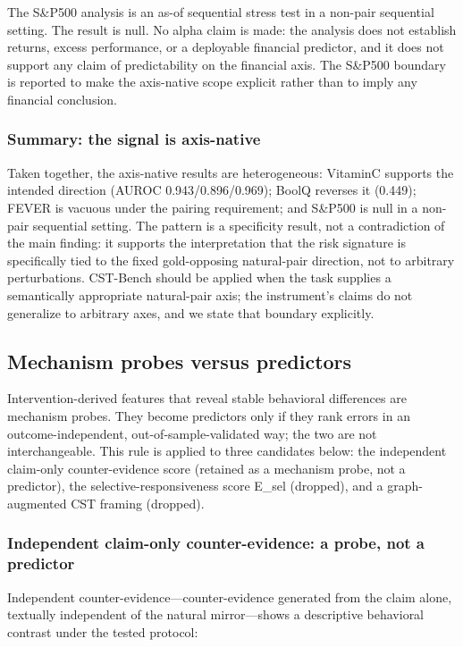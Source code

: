 \documentclass[11pt]{article}
\begin{document}
The S\&P500 analysis is an as-of sequential stress test in a non-pair sequential setting. The result is null. No alpha claim is made: the analysis does not establish returns, excess performance, or a deployable financial predictor, and it does not support any claim of predictability on the financial axis. The S\&P500 boundary is reported to make the axis-native scope explicit rather than to imply any financial conclusion.

\subsubsection{Summary: the signal is axis-native}

Taken together, the axis-native results are heterogeneous: VitaminC supports the intended direction (AUROC 0.943/0.896/0.969); BoolQ reverses it (0.449); FEVER is vacuous under the pairing requirement; and S\&P500 is null in a non-pair sequential setting. The pattern is a specificity result, not a contradiction of the main finding: it supports the interpretation that the risk signature is specifically tied to the fixed gold-opposing natural-pair direction, not to arbitrary perturbations. CST-Bench should be applied when the task supplies a semantically appropriate natural-pair axis; the instrument's claims do not generalize to arbitrary axes, and we state that boundary explicitly.

\subsection{Mechanism probes versus predictors}

Intervention-derived features that reveal stable behavioral differences are mechanism probes. They become predictors only if they rank errors in an outcome-independent, out-of-sample-validated way; the two are not interchangeable. This rule is applied to three candidates below: the independent claim-only counter-evidence score (retained as a mechanism probe, not a predictor), the selective-responsiveness score E\_\allowbreak{}sel (dropped), and a graph-augmented CST framing (dropped).

\subsubsection{Independent claim-only counter-evidence: a probe, not a predictor}

Independent counter-evidence---counter-evidence generated from the claim alone, textually independent of the natural mirror---shows a descriptive behavioral contrast under the tested protocol:
\end{document}
